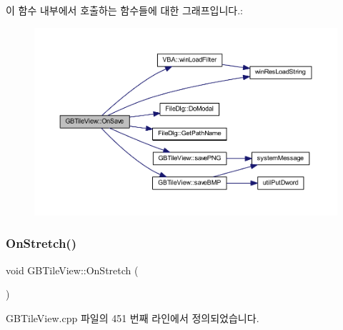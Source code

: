 이 함수 내부에서 호출하는 함수들에 대한 그래프입니다.\+:
\nopagebreak
\begin{figure}[H]
\begin{center}
\leavevmode
\includegraphics[width=350pt]{class_g_b_tile_view_a97f989bc4a5f5872258b5d8d47ae60d0_cgraph}
\end{center}
\end{figure}
\mbox{\label{class_g_b_tile_view_a7386c9ed9651610461d4342ebd492bf9}} 
\subsubsection{\texorpdfstring{On\+Stretch()}{OnStretch()}}
{\footnotesize\ttfamily void G\+B\+Tile\+View\+::\+On\+Stretch (\begin{DoxyParamCaption}{ }\end{DoxyParamCaption})\hspace{0.3cm}{\ttfamily [protected]}}



G\+B\+Tile\+View.\+cpp 파일의 451 번째 라인에서 정의되었습니다.


